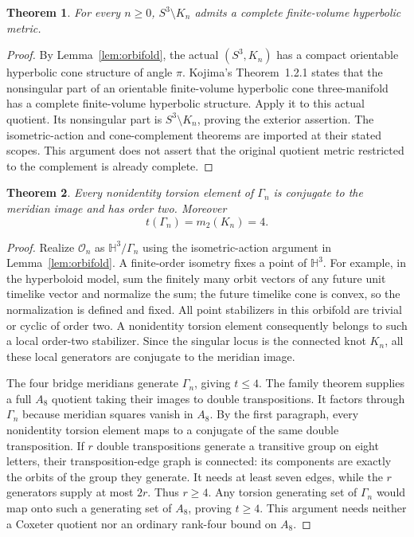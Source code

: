 \documentclass[11pt]{article}
\newtheorem{theorem}{Theorem}
\begin{document}
\begin{theorem}\label{thm:exterior}
For every $n\ge0$, $S^3\setminus K_n$ admits a complete
finite-volume hyperbolic metric.
\end{theorem}
\begin{proof}
By Lemma~\ref{lem:orbifold}, the actual $(S^3,K_n)$ has a compact
orientable hyperbolic cone structure of angle $\pi$.
Kojima's Theorem~1.2.1 \cite[pp.~5--6]{kojima} states that the
nonsingular part of an orientable finite-volume hyperbolic cone
three-manifold has a complete finite-volume hyperbolic structure.
Apply it to this actual quotient. Its nonsingular part is
$S^3\setminus K_n$, proving the exterior assertion.
The isometric-action and cone-complement theorems
are imported at their stated scopes. This argument does not assert
that the original quotient metric restricted to the complement is
already complete.
\end{proof}

\begin{theorem}\label{thm:torsion}
Every nonidentity torsion element of $\Gamma_n$ is conjugate to the
meridian image and has order two. Moreover
\[
                              t(\Gamma_n)=m_2(K_n)=4.
\]
\end{theorem}
\begin{proof}
Realize $\mathcal O_n$ as $\mathbb H^3/\Gamma_n$ using the
isometric-action argument in Lemma~\ref{lem:orbifold}.
A finite-order isometry fixes a point of $\mathbb H^3$.
For example, in the hyperboloid model, sum the finitely many orbit
vectors of any future unit timelike vector and normalize the sum;
the future timelike cone is convex, so the normalization is defined
and fixed. All point stabilizers in this orbifold are trivial or
cyclic of order two. A nonidentity torsion element consequently
belongs to such a local order-two stabilizer. Since the singular
locus is the connected knot $K_n$, all these local generators are
conjugate to the meridian image.

The four bridge meridians generate $\Gamma_n$, giving $t\le4$.
The family theorem supplies a full $A_8$ quotient taking their images
to double transpositions. It factors through $\Gamma_n$ because
meridian squares vanish in $A_8$. By the first paragraph, every
nonidentity torsion element maps to a conjugate of the same double
transposition. If $r$ double transpositions generate a transitive
group on eight letters, their transposition-edge graph is connected:
its components are exactly the orbits of the group they generate.
It needs at least seven edges, while the $r$ generators supply at
most $2r$. Thus $r\ge4$. Any torsion generating set of $\Gamma_n$
would map onto such a generating set of $A_8$, proving $t\ge4$.
This argument needs neither a Coxeter quotient nor an ordinary
rank-four bound on $A_8$.
\end{proof}
\end{document}
